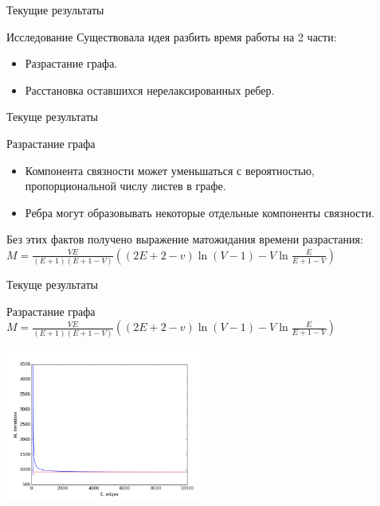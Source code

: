 \documentclass{beamer}
\begin{document}
\begin{frame}{Текущие результаты}
\begin{block}{Исследование}
Существовала идея разбить время работы на 2 части:
\begin{itemize}
 \item Разрастание графа.
 \item Расстановка оставшихся нерелаксированных ребер.
\end{itemize}
\end{block}
\end{frame}


\begin{frame}{Текуще результаты}
\begin{block}{Разрастание графа}
\begin{itemize}
 \item Компонента связности может уменьшаться с вероятностью, пропорциональной числу листев в графе.
 \item Ребра могут образовывать некоторые отдельные компоненты связности.
\end{itemize}
Без этих фактов получено выражение матожидания времени разрастания:
$M = \frac{VE}{(E + 1)(E + 1 - V)} \left( (2E + 2 - v) \ln (V - 1) - V \ln \frac{E}{E + 1 - V}\right)$
\end{block}
\end{frame}

\begin{frame}{Текуще результаты}
\begin{block}{Разрастание графа}
$M = \frac{VE}{(E + 1)(E + 1 - V)} \left( (2E + 2 - v) \ln (V - 1) - V \ln \frac{E}{E + 1 - V}\right)$
\begin{center}
\includegraphics*[height=5cm]{pic/Formula.png}
\end{center}
\end{block}
\end{frame}
\end{document}
